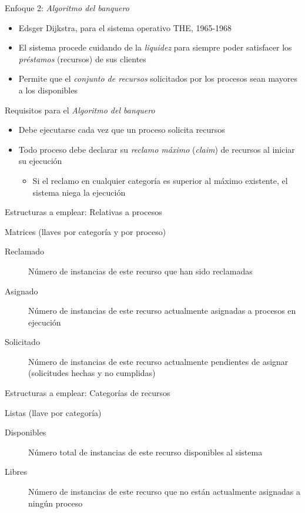 \documentclass[presentation]{beamer}
\begin{document}
\begin{frame}[label={sec:orgf102f38}]{Enfoque 2: \emph{Algoritmo del banquero}}
\begin{itemize}
\item Edsger Dijkstra, para el sistema operativo THE, 1965-1968
\item El sistema procede cuidando de la \emph{liquidez} para siempre poder
satisfacer los \emph{préstamos} (recursos) de sus clientes
\item Permite que el \emph{conjunto de recursos} solicitados por los procesos
sean mayores a los disponibles
\end{itemize}
\end{frame}

\begin{frame}[label={sec:org007d478}]{Requisitos para el \emph{Algoritmo del banquero}}
\begin{itemize}
\item Debe ejecutarse cada vez que un proceso solicita recursos
\item Todo proceso debe declarar su \emph{reclamo máximo} (\emph{claim}) de
recursos al iniciar su ejecución
\begin{itemize}
\item Si el reclamo en cualquier categoría es superior al máximo
existente, el sistema niega la ejecución
\end{itemize}
\end{itemize}
\end{frame}

\begin{frame}[label={sec:org4380007}]{Estructuras a emplear: Relativas a procesos}
\begin{center}
Matrices (llaves por categoría y por proceso)
\end{center}
\begin{description}
\item[{Reclamado}] Número de instancias de este recurso que han sido
reclamadas
\item[{Asignado}] Número de instancias de este recurso actualmente
asignadas a procesos en ejecución
\item[{Solicitado}] Número de instancias de este recurso actualmente
pendientes de asignar (solicitudes hechas y no
cumplidas)
\end{description}
\end{frame}

\begin{frame}[label={sec:org69d5b13}]{Estructuras a emplear: Categorías de recursos}
\begin{center}
Listas (llave por categoría)
\end{center}
\begin{description}
\item[{Disponibles}] Número total de instancias de este recurso
disponibles al sistema

\item[{Libres}] Número de instancias de este recurso que no están
actualmente asignadas a ningún proceso
\end{description}
\end{frame}
\end{document}
